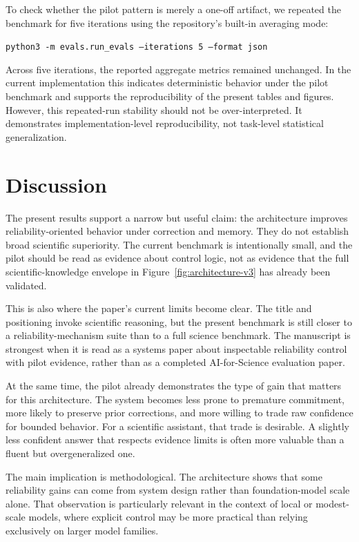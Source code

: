 \documentclass[12pt]{article}
\begin{document}
To check whether the pilot pattern is merely a one-off artifact, we repeated the benchmark for five iterations using the repository's built-in averaging mode:

\begin{center}
\texttt{python3 -m evals.run\_evals --iterations 5 --format json}
\end{center}

Across five iterations, the reported aggregate metrics remained unchanged. In the current implementation this indicates deterministic behavior under the pilot benchmark and supports the reproducibility of the present tables and figures. However, this repeated-run stability should not be over-interpreted. It demonstrates implementation-level reproducibility, not task-level statistical generalization.

\section{Discussion}

The present results support a narrow but useful claim: the architecture improves reliability-oriented behavior under correction and memory. They do not establish broad scientific superiority. The current benchmark is intentionally small, and the pilot should be read as evidence about control logic, not as evidence that the full scientific-knowledge envelope in Figure~\ref{fig:architecture-v3} has already been validated.

This is also where the paper's current limits become clear. The title and positioning invoke scientific reasoning, but the present benchmark is still closer to a reliability-mechanism suite than to a full science benchmark. The manuscript is strongest when it is read as a systems paper about inspectable reliability control with pilot evidence, rather than as a completed AI-for-Science evaluation paper.

At the same time, the pilot already demonstrates the type of gain that matters for this architecture. The system becomes less prone to premature commitment, more likely to preserve prior corrections, and more willing to trade raw confidence for bounded behavior. For a scientific assistant, that trade is desirable. A slightly less confident answer that respects evidence limits is often more valuable than a fluent but overgeneralized one.

The main implication is methodological. The architecture shows that some reliability gains can come from system design rather than foundation-model scale alone. That observation is particularly relevant in the context of local or modest-scale models, where explicit control may be more practical than relying exclusively on larger model families.
\end{document}

